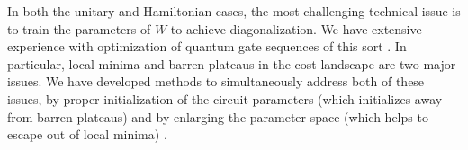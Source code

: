 \documentclass[10pt]{article}
\begin{document}
In both the unitary and Hamiltonian cases, the most challenging technical issue is to train the parameters of $W$ to achieve diagonalization. We have extensive experience with optimization of quantum gate sequences of this sort \cite{Khatri2018, LaRose2018}. In particular, local minima and barren plateaus in the cost landscape are two major issues. We have developed methods to simultaneously address both of these issues, by proper initialization of the circuit parameters (which initializes away from barren plateaus) and by enlarging the parameter space (which helps to escape out of local minima) \cite{LaRose2018}. 








\end{document}
